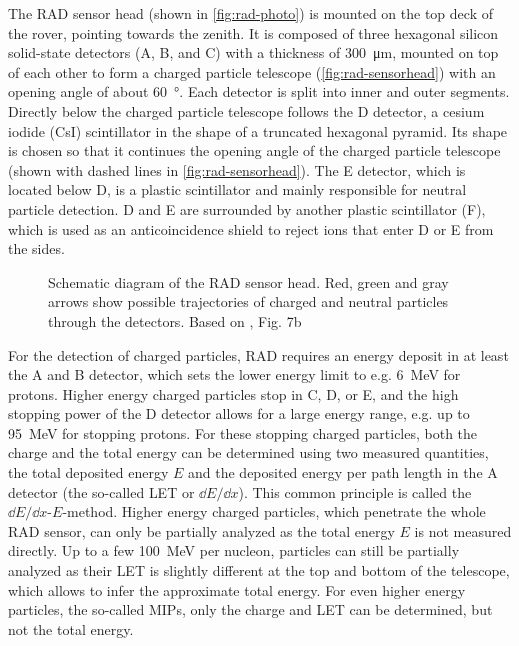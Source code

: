 The \ac{RAD} sensor head (shown in \autoref{fig:rad-photo}) is mounted on the top deck of the rover, pointing towards the zenith. It is composed of three hexagonal silicon solid-state detectors (A, B, and C) with a thickness of \SI{300}{\micro\meter}, mounted on top of each other to form a charged particle telescope (\autoref{fig:rad-sensorhead}) with an opening angle of about \SI{60}{\degree}. Each detector is split into inner and outer segments.
Directly below the charged particle telescope follows the D detector, a cesium iodide (CsI) scintillator in the shape of a truncated hexagonal pyramid. Its shape is chosen so that it continues the opening angle of the charged particle telescope (shown with dashed lines in \autoref{fig:rad-sensorhead}). The E detector, which is located below D, is a plastic scintillator and mainly responsible for neutral particle detection. D and E are surrounded by another plastic scintillator (F), which is used as an anticoincidence shield to reject ions that enter D or E from the sides.

\begin{figure}
	\centering
	
	\caption[Schematic diagram of the \acs{RAD} sensor head]{Schematic diagram of the \ac{RAD} sensor head. Red, green and gray arrows show possible trajectories of charged and neutral particles through the detectors. Based on      \textcite{Hassler-2012-MSLRAD}, Fig. 7b}
	\label{fig:rad-sensorhead}
\end{figure}

For the detection of charged particles, \ac{RAD} requires an energy deposit in at least the A and B detector, which sets the lower energy limit to e.g. \SI{6}{\mega\electronvolt} for protons. Higher energy charged particles stop in C, D, or E, and the high stopping power of the D detector allows for a large energy range, e.g. up to \SI{95}{\mega\electronvolt} for stopping protons. For these stopping charged particles, both the charge and the total energy can be determined using two measured quantities, the total deposited energy $E$ and the deposited energy per path length in the A detector (the so-called \ac{LET} or $\dd E/\dd x$). This common principle is called the $\dd E/\dd x$-$E$-method.
Higher energy charged particles, which penetrate the whole \ac{RAD} sensor, can only be partially analyzed as the total energy $E$ is not measured directly. Up to a few \SI{100}{\mega\electronvolt} per nucleon, particles can still be partially analyzed as their \ac{LET} is slightly different at the top and bottom of the telescope, which allows to infer the approximate total energy. For even higher energy particles, the so-called \acp{MIP}, only the charge and \ac{LET} can be determined, but not the total energy.

